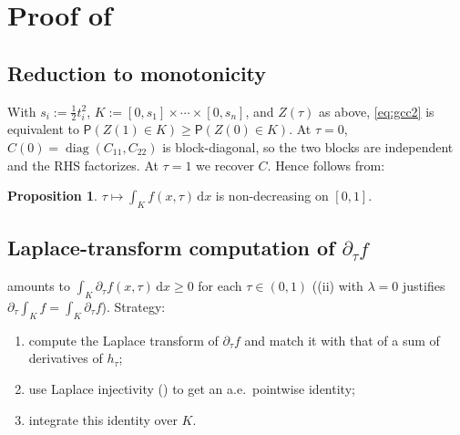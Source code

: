\documentclass[14pt]{extarticle}
\theoremstyle{definition}
\newtheorem{proposition}[theorem]{Proposition}
\newcommand{\PP}{\mathsf{P}}
\newcommand{\diag}{\operatorname{diag}}
\newcommand{\dd}{\mathrm{d}}
\begin{document}
\section{Proof of }\label{sec:proof}

\subsection{Reduction to monotonicity}

With $s_i:=\tfrac{1}{2}t_i^2$, $K:=[0,s_1]\times\cdots\times[0,s_n]$,
and $Z(\tau)$ as above, \eqref{eq:gcc2} is equivalent to
$\PP(Z(1)\in K)\geqslant\PP(Z(0)\in K)$.  At $\tau=0$,
$C(0)=\diag(C_{11},C_{22})$ is block-diagonal, so the two blocks are
independent and the RHS factorizes.  At $\tau=1$ we recover $C$.
Hence  follows from:

\begin{proposition}\label{prop:key}
  $\tau\mapsto\int_K f(x,\tau)\,\dd x$ is non-decreasing on $[0,1]$.
\end{proposition}

\subsection{Laplace-transform computation of $\partial_\tau f$}

 amounts to $\int_K\partial_\tau f(x,\tau)\,\dd x\geqslant 0$
for each $\tau\in(0,1)$ ((ii) with $\lambda=0$ justifies
$\partial_\tau\int_K f=\int_K\partial_\tau f$).  Strategy:
\begin{enumerate}[label=(\alph*)]
  \item compute the Laplace transform of $\partial_\tau f$ and match
    it with that of a sum of derivatives of $h_\tau$;
  \item use Laplace injectivity () to get an
    a.e.\ pointwise identity;
  \item integrate this identity over $K$.
\end{enumerate}
\end{document}
